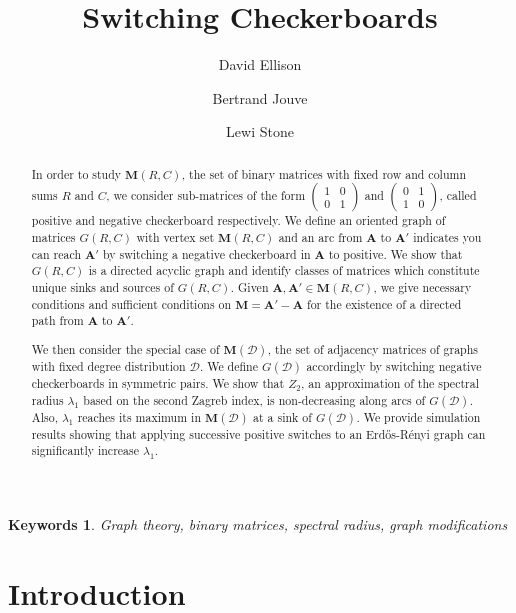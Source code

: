 \documentclass{article}
\title{Switching Checkerboards}
\author[1]{David Ellison}
\author[2]{Bertrand Jouve}
\author[1]{Lewi Stone}
\affil[1]{RMIT University, School of Science, Melbourne, Australia}
\affil[2]{LISST UMR5193, Toulouse University, CNRS, France}
\date{}
\newtheorem*{keywords}{Keywords}
\newcommand{\D}{\mathcal D}
\renewcommand{\ll}{\lambda_1}
\newcommand{\A}{\mathbf A}
\newcommand{\M}{\mathbf M}
\begin{document}
\maketitle              
          






\begin{abstract}
   In order to study $\M(R,C)$, the set of binary matrices with fixed row and column sums $R$ and $C$, we consider sub-matrices of the form $\begin{pmatrix}
1 & 0 \\
0 & 1
\end{pmatrix}$
and $\begin{pmatrix}
0 & 1 \\
1 & 0
\end{pmatrix}$, called positive and negative checkerboard respectively. We define an oriented graph of matrices $G(R,C)$ with vertex set $\M(R,C)$ and an arc from $\A$ to $\A'$ indicates you can reach $\A'$ by switching a negative checkerboard in $\A$ to positive. We show that $G(R,C)$ is a directed acyclic graph and identify classes of matrices which constitute unique sinks and sources of $G(R,C)$. Given $\A,\A'\in\M(R,C)$, we give necessary conditions and sufficient conditions on $\M=\A'-\A$ for the existence of a directed path from $\A$ to $\A'$.

We then consider the special case of $\M(\D)$, the set of adjacency matrices of graphs with fixed degree distribution $\D$. We define $G(\D)$ accordingly by switching negative checkerboards in symmetric pairs. We show that $Z_2$, an approximation of the spectral radius $\lambda_1$ based on the second Zagreb index, is non-decreasing along arcs of $G(\D)$. Also, $\ll$ reaches its maximum in $\M(\D)$ at a sink of $G(\D)$. We provide simulation results showing that applying successive positive switches to an Erd\H os-R\'enyi graph can significantly increase $\ll$.
\end{abstract}


\begin{keywords}
Graph theory, binary matrices, spectral radius, graph modifications
\end{keywords}




\section*{Introduction}
\end{document}
